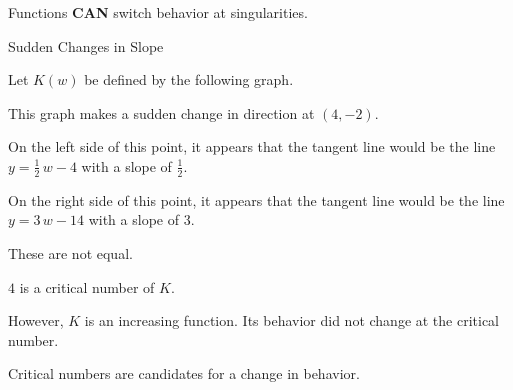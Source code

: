 \documentclass{ximera}
\begin{document}
Functions \textbf{\textcolor{red!70!black}{CAN}} switch behavior at singularities. 



\begin{example} Sudden Changes in Slope


Let $K(w)$ be defined by the following graph.



\begin{image}
\end{image}


This graph makes a sudden change in direction at $(4,-2)$.


On the left side of this point, it appears that the tangent line would be the line $y = \frac{1}{2} \, w - 4$ with a slope of $\frac{1}{2}$.


On the right side of this point, it appears that the tangent line would be the line $y = 3 \, w - 14$ with a slope of $3$.


These are not equal.

$4$ is a critical number of $K$.


However, $K$ is an increasing function. Its behavior did not change at the critical number.



\end{example}


Critical numbers are candidates for a change in behavior.
\end{document}
